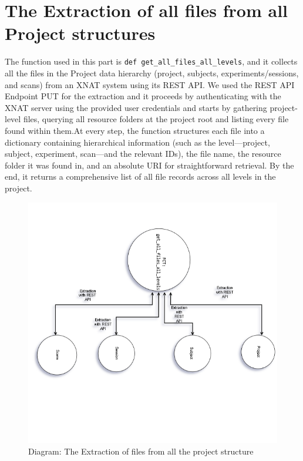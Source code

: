\section{The Extraction of all files from all Project structures}
The function used in this part is \texttt{def get\_all\_files\_all\_levels}, and it collects all the files in the Project data hierarchy (project, subjects, experiments/sessions, and scans) from an XNAT system using its REST API. We used the REST API Endpoint PUT for the extraction and it proceeds by authenticating with the XNAT server using the provided user credentials and starts by gathering project-level files, querying all resource folders at the project root and listing every file found within them.At every step, the function structures each file into a dictionary containing hierarchical information (such as the level—project, subject, experiment, scan—and the relevant IDs), the file name, the resource folder it was found in, and an absolute URI for straightforward retrieval. By the end, it returns a comprehensive list of all file records across all levels in the project. 

\begin{figure}
    \centering
    \includegraphics[width=0.9\linewidth]{en/content/edf1.png}
    \caption{Diagram: The Extraction of files from all the project structure}
    \label{fig:enter-label}
\end{figure}



